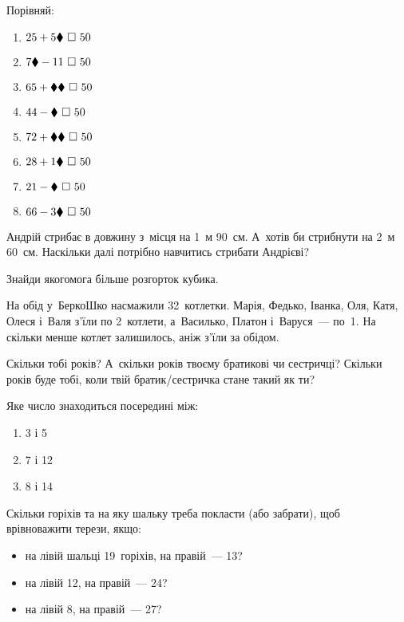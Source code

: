 Порівняй:
\begin{multicols}{2}
    \begin{enumerate}
        \item $25 + 5\hiddendigit \ \square \ 50$
        \item $7\hiddendigit - 11 \ \square \ 50$
        \item $65 + \hiddendigit\hiddendigit \ \square \ 50$
        \item $44 - \hiddendigit \ \square \ 50$
        \item $72 + \hiddendigit\hiddendigit \ \square \ 50$
        \item $28 + 1\hiddendigit \ \square \ 50$
        \item $21 - \hiddendigit \ \square \ 50$
        \item $66 - 3\hiddendigit \ \square \ 50$
    \end{enumerate}
\end{multicols}


\problem
Андрій стрибає в довжину з~місця на 1~м 90~см.
А~хотів би стрибнути на 2~м 60~см.
Наскільки далі потрібно навчитись стрибати Андрієві?


\problem
Знайди якогомога більше розгорток кубика.


\problem
На обід у~БеркоШко насмажили 32~котлетки.
Марія, Федько, Іванка, Оля, Катя, Олеся і~Валя з’їли по 2~котлети,
а~Василько, Платон і~Варуся~--- по~1.
На скільки менше котлет залишилось, аніж з’їли за обідом.


\problem
Скільки тобі років?
А~скільки років твоєму братикові чи сестричці?
Скільки років буде тобі, коли твій братик/сестричка стане такий як ти?


\problem
Яке число знаходиться посередині між:
\begin{multicols}{3}
    \begin{enumerate}
        \item 3 і 5
        \item 7 і 12
        \item 8 і 14
    \end{enumerate}
\end{multicols}


\problem
Скільки горіхів та на яку шальку треба покласти (або забрати),
щоб врівноважити терези, якщо:
\begin{itemize}
    \item на лівій шальці 19~горіхів, на правій~--- 13?
    \item на лівій 12, на правій~--- 24?
    \item на лівій 8, на правій~--- 27?
\end{itemize}


